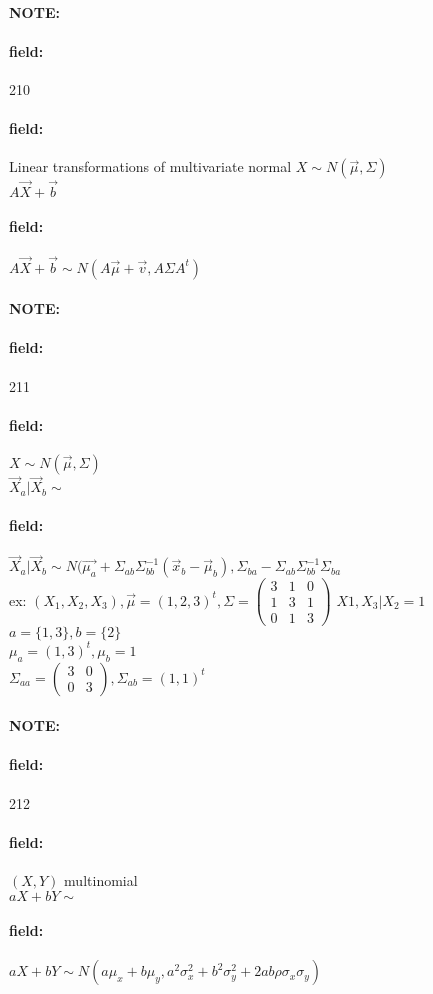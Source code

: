 \documentclass[12pt]{article}
\newenvironment{note}{\paragraph{NOTE:}}{}
\newenvironment{field}{\paragraph{field:}}{}
\begin{document}
\begin{note} \begin{field} \tiny 210 \end{field}
  \begin{field}
    Linear transformations of multivariate normal $X \sim N(\vec{\mu},\Sigma) $\\
    $A \vec{X} + \vec{b}$
  \end{field}
  \begin{field}
    $A \vec{X} + \vec{b} \sim N(A \vec{\mu} + \vec{v}, A \Sigma A^t)$
  \end{field}
\end{note}

\begin{note} \begin{field} \tiny 211 \end{field}
  \begin{field}
    $X \sim N(\vec{\mu},\Sigma) $\\

    $\vec{X}_a | \vec{X}_b \sim $
  \end{field}
  \begin{field}
    $\vec{X}_a | \vec{X}_b \sim N\big(\vec{\mu_a} + \Sigma_{ab} \Sigma^{-1}_{bb}(\vec{x}_b - \vec{\mu}_b), \Sigma_{ba} - \Sigma_{ab}\Sigma_{bb}^{-1}\Sigma_{ba}$\\

ex: $(X_1,X_2,X_3), \vec{\mu} = (1,2,3)^t, \Sigma = \begin{pmatrix}
  3 & 1 & 0 \\ 1 & 3 & 1 \\ 0 & 1 & 3
\end{pmatrix}$
$X1,X_3 | X_2 = 1$\\
$a = \{1,3\}, b = \{2\}$\\
$\mu_a = (1,3)^t, \mu_b = 1$\\
$\Sigma_{aa} = \begin{pmatrix}
  3 & 0 \\ 0 & 3
\end{pmatrix}, \Sigma_{ab} = (1,1)^t$

  \end{field}
\end{note}

\begin{note} \begin{field} \tiny 212 \end{field}
  \begin{field}
    $(X,Y)$ multinomial \\
    $aX + bY \sim $
  \end{field}
  \begin{field}
    $aX + bY \sim N(a \mu_x + b\mu_y, a^2 \sigma_x^2 + b^2 \sigma_y^2 + 2 ab \rho \sigma_x \sigma_y)$
  \end{field}
\end{note}
\end{document}
